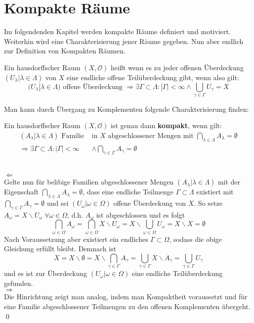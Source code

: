 \chapter{Kompakte Räume}
Im folgendenden Kapitel werden kompakte Räume definiert und motiviert. Weiterhin wird eine Charakterisierung jener Räume gegeben.
Nun aber endlich zur Definition von Kompakten Räumen.

\begin{Def}[Kompaktheit]
	Ein hausdorffscher Raum \((X, \mathcal{O})\) heißt  wenn es zu jeder offenen Überdeckung 
	\((U_{\lambda} | \lambda \in \Lambda)\) von \(X\) eine endliche offene Teilüberdeckung gibt, wenn also gilt:
	\[ (U_{\lambda} | \lambda \in \Lambda) \mbox{ offene Überdeckung }
     \Rightarrow \exists \Gamma \subset \Lambda : |\Gamma| < \infty \land \bigcup_{\gamma \in \Gamma} U_{\gamma} = X \] 
\end{Def}
Man kann durch Übergang zu Komplementen folgende Charakterisierung finden:

\begin{Satz}
	Ein hausdorffscher Raum \((X, \mathcal{O})\) ist genau dann \textbf{kompakt}, wenn gilt:
	\begin{align*}
		(A_{\lambda}| \lambda \in \Lambda) \mbox{ Familie } & \mbox{in } X \mbox{ abgeschlossener Mengen mit } 
		\bigcap_{\lambda \in \Lambda} A_{\lambda} = \emptyset \\
		\Rightarrow \exists \Gamma \subset \Lambda : |\Gamma| < \infty & \land \bigcap_{\gamma \in \Gamma} A_{\gamma} = \emptyset
	\end{align*} 
\end{Satz}
	\\
	\glqq\(\Leftarrow\)\grqq
	\\
	Gelte nun für belibige Familien abgeschlossener Mengen \((A_{\lambda}| \lambda \in \Lambda)\) mit der Eigenschaft
	\(\bigcap_{\lambda \in \Lambda} A_{\lambda} = \emptyset\), dass eine endliche Teilmenge \(\Gamma \subset \Lambda\) existiert mit
	\(\bigcap_{\gamma \in \Gamma} A_{\gamma} = \emptyset\) und sei \( (U_{\omega} | \omega \in \Omega) \) offene Überdeckung
	von \(X\). So setze \(A_{\omega} = X \backslash U_{\omega} \; \forall \omega \in \Omega\), d.h. \(A_{\omega}\) ist abgeschlossen
	und es folgt 
	\[\bigcap_{\omega \in \Omega} A_{\omega} = \bigcap_{\omega \in \Omega} X \backslash U_{\omega} =  X \backslash 
	\bigcup_{\omega \in \Omega} U_{\omega} = X \backslash X =  \emptyset \]
	Nach Voraussetzung aber existiert ein endliches \(\Gamma \subset \Omega\), sodass die obige Gleichung erfüllt bleibt. Demnach ist 
	\[ X = X \backslash \emptyset = X \backslash \bigcap_{\gamma \in \Gamma} A_{\gamma} = \bigcup_{\gamma \in \Gamma} X \backslash A_{\gamma} = 
	\bigcup_{\gamma \in \Gamma} U_{\gamma} \] 
	und es ist zur Überdeckung \( (U_{\omega} | \omega \in \Omega) \) eine endliche Teilüberdeckung gefunden.
	\\
	\glqq\(\Rightarrow\)\grqq
	\\
	Die Hinrichtung zeigt man analog, indem man Kompaktheit voraussetzt und für eine Familie abgeschlossener Teilmengen zu den 
	offenen Komplementen übergeht.
\qed

